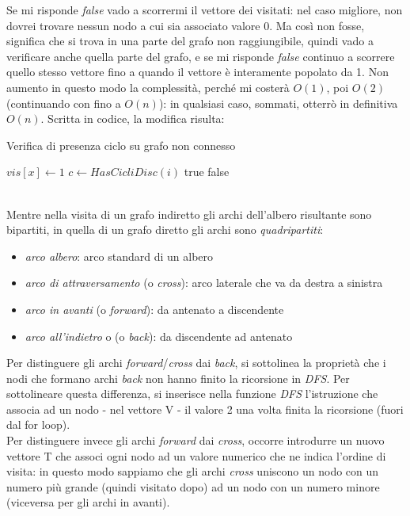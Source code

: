 Se mi risponde \textit{false} vado a scorrermi il vettore dei visitati: nel caso migliore, non dovrei trovare nessun nodo a cui sia associato valore 0. Ma così non fosse, significa che si trova in una parte del grafo non raggiungibile, quindi vado a verificare anche quella parte del grafo, e se mi risponde \textit{false} continuo a scorrere quello stesso vettore fino a quando il vettore è interamente popolato da 1. Non aumento in questo modo la complessità, perché mi costerà $O(1)$, poi $O(2)$ (continuando con fino a $O(n)$): in qualsiasi caso, sommati, otterrò in definitiva $O(n)$. Scritta in codice, la modifica risulta:
\begin{algorithm}
    \caption{Verifica di presenza ciclo su grafo non connesso}\label{alg:VPCnC}
    \begin{algorithmic}[1]
            \State $vis[x] \gets 1$
	                \State $c \gets HasCicliDisc(i) $
                \EndIf
                    \Return true
                \EndIf
            \EndFor
            \State \Return false
        \EndFunction
    \end{algorithmic}
\end{algorithm} \hfill \\

Mentre nella visita di un grafo indiretto gli archi dell'albero risultante sono bipartiti, in quella di un grafo diretto gli archi sono \textit{quadripartiti}:
\begin{itemize}
	\item \textit{arco albero}: arco standard di un albero
	\item \textit{arco di attraversamento} (o \textit{cross}): arco laterale che va da destra a sinistra
	\item \textit{arco in avanti} (o \textit{forward}): da antenato a discendente
	\item \textit{arco all'indietro} o (o \textit{back}): da discendente ad antenato
\end{itemize} 
Per distinguere gli archi \textit{forward}/\textit{cross} dai \textit{back}, si sottolinea la proprietà che i nodi che formano archi \textit{back} non hanno finito la ricorsione in \textit{DFS}.
Per sottolineare questa differenza, si inserisce nella funzione \textit{DFS} l'istruzione che associa ad un nodo - nel vettore V - il valore 2 una volta finita la ricorsione (fuori dal for loop). \\
Per distinguere invece gli archi \textit{forward} dai \textit{cross}, occorre introdurre un nuovo vettore T che associ ogni nodo ad un valore numerico che ne indica l'ordine di visita: in questo modo sappiamo che gli archi \textit{cross} uniscono un nodo con un numero più grande (quindi visitato dopo) ad un nodo con un numero minore (viceversa per gli archi in avanti).

